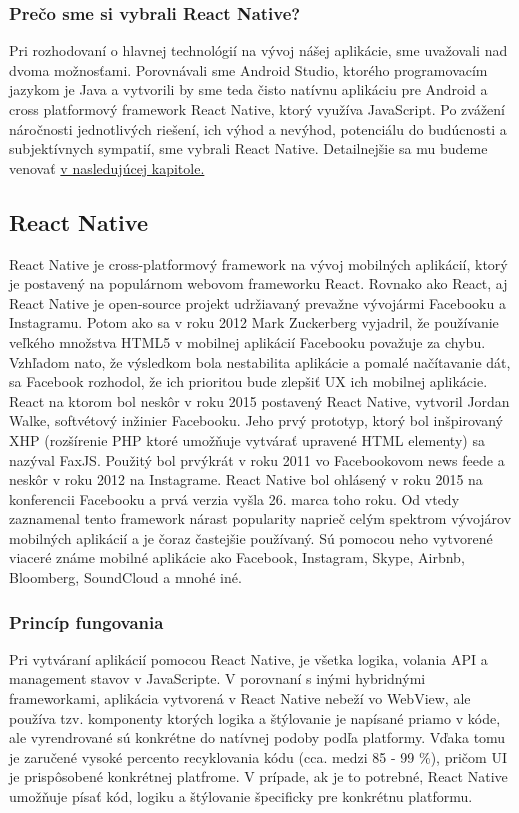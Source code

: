 \subsubsection{Prečo sme si vybrali React Native?}
Pri rozhodovaní o hlavnej technológií na vývoj nášej aplikácie, sme uvažovali nad dvoma možnosťami. Porovnávali sme Android Studio, ktorého programovacím jazykom je Java a vytvorili by sme teda čisto natívnu aplikáciu pre Android a cross platformový framework React Native, ktorý využíva JavaScript. Po zvážení náročnosti jednotlivých riešení, ich výhod a nevýhod, potenciálu do budúcnosti a subjektívnych sympatií, sme vybrali React Native. Detailnejšie sa mu budeme venovať \hyperref[sec:React Native]{v nasledujúcej kapitole.}


\subsection{React Native}
\label{sec:React Native}

React Native je cross-platformový framework na vývoj mobilných aplikácií, ktorý je postavený na populárnom webovom frameworku React. Rovnako ako React, aj React Native je open-source projekt udržiavaný prevažne vývojármi Facebooku a Instagramu. Potom ako sa v roku 2012 Mark Zuckerberg vyjadril, že používanie veľkého množstva HTML5 v mobilnej aplikácií Facebooku považuje za chybu. Vzhľadom nato, že výsledkom bola nestabilita aplikácie a pomalé načítavanie dát, sa Facebook rozhodol, že ich prioritou bude zlepšiť UX ich mobilnej aplikácie. React na ktorom bol neskôr v roku 2015 postavený React Native, vytvoril Jordan Walke, softvétový inžinier Facebooku. Jeho prvý prototyp, ktorý bol inšpirovaný XHP (rozšírenie PHP ktoré umožňuje vytvárať upravené HTML elementy) sa nazýval FaxJS. Použitý bol prvýkrát v roku 2011 vo Facebookovom news feede a neskôr v roku 2012 na Instagrame. React Native bol ohlásený v roku 2015 na konferencii Facebooku a prvá verzia vyšla 26. marca toho roku. Od vtedy zaznamenal tento framework nárast popularity naprieč celým spektrom vývojárov mobilných aplikácií a je čoraz častejšie používaný. Sú pomocou neho vytvorené viaceré známe mobilné aplikácie ako Facebook, Instagram, Skype, Airbnb, Bloomberg, SoundCloud a mnohé iné.
\subsubsection{Princíp fungovania}
Pri vytváraní aplikácií pomocou React Native, je všetka logika, volania API a management stavov v JavaScripte. V porovnaní s inými hybridnými frameworkami, aplikácia vytvorená v React Native nebeží vo WebView, ale používa tzv. komponenty ktorých logika a štýlovanie je napísané priamo v kóde, ale vyrendrované sú konkrétne do natívnej podoby podľa platformy. Vďaka tomu je zaručené vysoké percento recyklovania kódu (cca. medzi 85 - 99 \%), pričom UI je prispôsobené konkrétnej platfrome. V prípade, ak je to potrebné, React Native umožňuje písať kód, logiku a štýlovanie špecificky pre konkrétnu platformu. 
